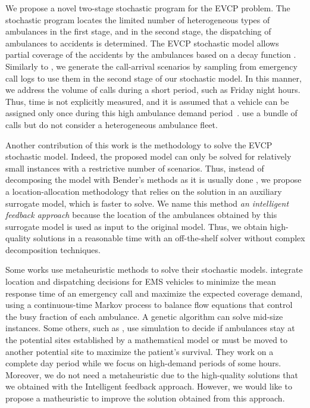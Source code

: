 We propose a novel two-stage stochastic program for the EVCP problem. The stochastic program locates the limited number of heterogeneous types of ambulances in the first stage, and in the second stage, the dispatching of ambulances to accidents is determined. The EVCP stochastic model allows partial coverage of the accidents by the ambulances based on a decay function \citep{wang2016new}. Similarly to \citet{yoon2021stochastic}, we generate the call-arrival scenarios by sampling from emergency call logs to use them in the second stage of our stochastic model. In this manner, we address the volume of calls during a short period, such as Friday night hours. Thus, time is not explicitly measured, and it is assumed that a vehicle can be assigned only once during this high ambulance demand period~\citep{zhou2015spatio}. \citet{boujemaa2018stochastic} use a bundle of calls but do not consider a heterogeneous ambulance fleet. 

Another contribution of this work is the methodology to solve the EVCP stochastic model. Indeed, the proposed model can only be solved for relatively small instances with a restrictive number of scenarios. Thus, instead of decomposing the model with Bender's methods as it is usually done \cite{zhang2023multi, sung2018scenario}, we propose a location-allocation methodology \cite{shaw2022location, van2018demand} that relies on the solution in an auxiliary surrogate model, which is faster to solve. We name this method \textit{an intelligent feedback approach} because the location of the ambulances obtained by this surrogate model is used as input to the original model. Thus, we obtain high-quality solutions in a reasonable time with an off-the-shelf solver without complex decomposition techniques.

Some works use metaheuristic methods to solve their stochastic models. \citet{toro2013joint} integrate location and dispatching decisions for EMS vehicles to minimize the mean response time of an emergency call and maximize the expected coverage demand, using a continuous-time Markov process to balance flow equations that control the busy fraction of each ambulance. A genetic algorithm can solve mid-size instances. Some others, such as \citet{amorim2019traffic}, use simulation to decide if ambulances stay at the potential sites established by a mathematical model or must be moved to another potential site to maximize the patient's survival. They work on a complete day period while we focus on high-demand periods of some hours. Moreover, we do not need a metaheuristic due to the high-quality solutions that we obtained with the Intelligent feedback approach. However, we would like to propose a matheuristic to improve the solution obtained from this approach.


